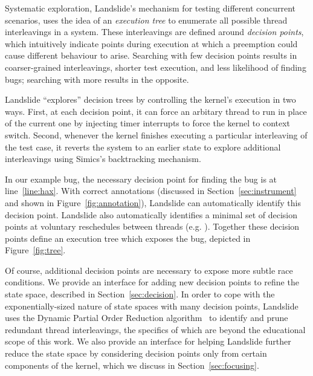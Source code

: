 Systematic exploration, Landslide's mechanism for testing different concurrent scenarios, uses the idea of an {\em execution tree} to enumerate all possible thread interleavings in a system. These interleavings are defined around {\em decision points}, which intuitively indicate points during execution at which a preemption could cause different behaviour to arise.
Searching with few decision points results in coarser-grained interleavings, shorter test execution, and less likelihood of finding bugs; searching with more results in the opposite.

Landslide ``explores'' decision trees by controlling the kernel's execution in two ways.
First, at each decision point, it can force an arbitary thread to run in place of the current one by injecting timer interrupts to force the kernel to context switch.
Second, whenever the kernel finishes executing a particular interleaving of the test case, it reverts the system to an earlier state to explore additional interleavings using Simics's backtracking mechanism.

In our example bug, the necessary decision point for finding the bug is at line~\ref{line:hax}. With correct annotations (discussed in Section~\ref{sec:instrument} and shown in Figure~\ref{fig:annotation}), Landslide can automatically identify this decision point.
Landslide also automatically identifies a minimal set of decision points at voluntary reschedules between threads (e.g. ). Together these decision points define an execution tree which exposes the bug, depicted in Figure~\ref{fig:tree}.

Of course, additional decision points are necessary to expose more subtle race conditions. We provide an interface for adding new decision points to refine the state space, described in Section~\ref{sec:decision}.
In order to cope with the exponentially-sized nature of state spaces with many decision points, Landslide uses the Dynamic Partial Order Reduction algorithm~\cite{dpor} to identify and prune redundant thread interleavings, the specifics of which are beyond the educational scope of this work.
We also provide an interface for helping Landslide further reduce the state space by considering decision points only from certain components of the kernel, which we discuss in Section~\ref{sec:focusing}.

